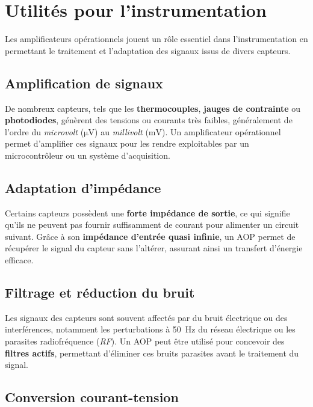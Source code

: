 \section{Utilités pour l’instrumentation}

Les amplificateurs opérationnels jouent un rôle essentiel dans l’instrumentation 
en permettant le traitement et l’adaptation des signaux issus de divers capteurs.

\subsection{Amplification de signaux}

De nombreux capteurs, tels que les \textbf{thermocouples}, 
\textbf{jauges de contrainte} ou \textbf{photodiodes}, génèrent des tensions ou 
courants très faibles, généralement de l’ordre du \textit{microvolt} (\(\unit{\micro\volt}\)) 
au \textit{millivolt} (\(\unit{\milli\volt}\)). Un amplificateur opérationnel permet d’amplifier ces signaux pour les rendre exploitables par un microcontrôleur ou un système d’acquisition.

\subsection{Adaptation d’impédance}

Certains capteurs possèdent une \textbf{forte impédance de sortie}, ce qui 
signifie qu’ils ne peuvent pas fournir suffisamment de courant pour alimenter un 
circuit suivant. Grâce à son \textbf{impédance d’entrée quasi infinie}, un AOP 
permet de récupérer le signal du capteur sans l’altérer, assurant ainsi un 
transfert d’énergie efficace.

\subsection{Filtrage et réduction du bruit}

Les signaux des capteurs sont souvent affectés par du bruit électrique ou des 
interférences, notamment les perturbations à \SI{50}{Hz} du réseau électrique 
ou les parasites radiofréquence (\textit{RF}). Un AOP peut être utilisé pour 
concevoir des \textbf{filtres actifs}, permettant d’éliminer ces bruits 
parasites avant le traitement du signal.

\subsection{Conversion courant-tension}

